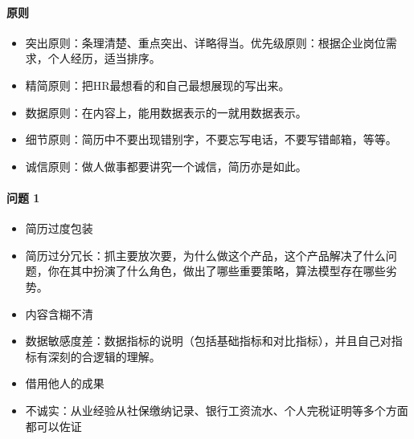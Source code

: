 \documentclass[letterpaper,11pt,english]{sphinxmanual}
\begin{document}
\paragraph{原则}
\label{\detokenize{chapter_interview/CV:id5}}\begin{itemize}
\item {} 
突出原则：条理清楚、重点突出、详略得当。优先级原则：根据企业岗位需求，个人经历，适当排序。

\item {} 
精简原则：把HR最想看的和自己最想展现的写出来。

\item {} 
数据原则：在内容上，能用数据表示的一就用数据表示。

\item {} 
细节原则：简历中不要出现错别字，不要忘写电话，不要写错邮箱，等等。

\item {} 
诚信原则：做人做事都要讲究一个诚信，简历亦是如此。%
\begin{footnote}[764]\sphinxAtStartFootnote
{}
%
\end{footnote}

\end{itemize}


\paragraph{问题 1\sphinxfootnotemark[765]}
\label{\detokenize{chapter_interview/CV:id6}}%
\begin{footnotetext}[765]\sphinxAtStartFootnote
{}
%
\end{footnotetext}\ignorespaces \begin{itemize}
\item {} 
简历过度包装

\item {} 
简历过分冗长：抓主要放次要，为什么做这个产品，这个产品解决了什么问题，你在其中扮演了什么角色，做出了哪些重要策略，算法模型存在哪些劣势。

\item {} 
内容含糊不清

\item {} 
数据敏感度差：数据指标的说明（包括基础指标和对比指标），并且自己对指标有深刻的合逻辑的理解。

\item {} 
借用他人的成果

\item {} 
不诚实：从业经验从社保缴纳记录、银行工资流水、个人完税证明等多个方面都可以佐证

\end{itemize}
\end{document}
